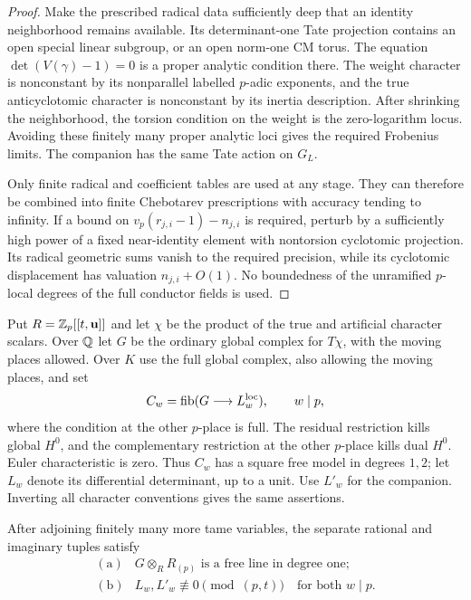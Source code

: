 \begin{proof}
Make the prescribed radical data sufficiently deep that an identity
neighborhood remains available.  Its determinant-one Tate projection
contains an open special linear subgroup, or an open norm-one CM
torus.  The equation $\det(V(\gamma)-1)=0$ is a proper analytic
condition there.  The weight character is nonconstant by its
nonparallel labelled $p$-adic exponents, and the true
anticyclotomic character is nonconstant by its inertia description.
After shrinking the neighborhood, the torsion condition on the
weight is the zero-logarithm locus.  Avoiding these finitely many
proper analytic loci gives the required Frobenius limits.  The
companion has the same Tate action on $G_L$.

Only finite radical and coefficient tables are used at any stage.
They can therefore be combined into finite Chebotarev prescriptions
with accuracy tending to infinity.  If a bound on
$v_p(r_{j,i}-1)-n_{j,i}$ is required, perturb by a sufficiently high
power of a fixed near-identity element with nontorsion cyclotomic
projection.  Its radical geometric sums vanish to the required
precision, while its cyclotomic displacement has valuation
$n_{j,i}+O(1)$.
No boundedness of the unramified $p$-local degrees of the full
conductor fields is used.
\end{proof}

Put $R=\mathbb Z_p[[t,\mathbf u]]$ and let $\chi$ be the product of the
true and artificial character scalars.  Over $\mathbb Q$ let $G$ be the
ordinary global complex for $T\chi$, with the moving places allowed.
Over $K$ use the full global complex, also allowing the moving
places, and set
\[
 C_w=\operatorname{fib}(G\longrightarrow L_w^{\rm loc}),
 \qquad w\mid p,
\]
where the condition at the other $p$-place is full.  The residual
restriction kills global $H^0$, and the complementary restriction
at the other $p$-place kills dual $H^0$.  Euler characteristic is
zero.  Thus $C_w$ has a square free model in degrees $1,2$; let
$L_w$ denote its differential determinant, up to a unit.  Use
$L'_w$ for the companion.  Inverting all character conventions
gives the same assertions.

\begin{proposition}\label{vertical:tests}
After adjoining finitely many more tame variables, the separate
rational and imaginary tuples satisfy
\begin{equation}\label{eq:source-1}\tag{1}
 \begin{array}{ll}
 \mathrm{(a)}&G\otimes_RR_{(p)}\text{ is a free line in degree one};\\[2pt]
 \mathrm{(b)}&L_w,L'_w\not\equiv0\pmod{(p,t)}
                  \quad\text{for both }w\mid p.
 \end{array}
\end{equation}
\end{proposition}

